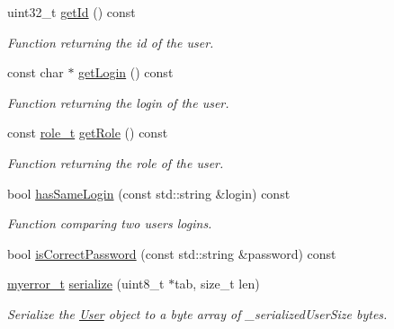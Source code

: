 \begin{DoxyCompactItemize}
uint32\+\_\+t \hyperlink{classUser_aad4f937d81f2db57d71d72aa65fabe84}{get\+Id} () const 
\begin{DoxyCompactList}\small\item\em Function returning the id of the user. \end{DoxyCompactList}\item 
const char $\ast$ \hyperlink{classUser_adba4ac3eacf305b1dcfa7b82dc95817e}{get\+Login} () const 
\begin{DoxyCompactList}\small\item\em Function returning the login of the user. \end{DoxyCompactList}\item 
const \hyperlink{user_8hpp_a147824aa4797bb7a9bcf276b5de0cb7c}{role\+\_\+t} \hyperlink{classUser_a66cf30e2ff6ffcca4b008aa0def0176a}{get\+Role} () const 
\begin{DoxyCompactList}\small\item\em Function returning the role of the user. \end{DoxyCompactList}\item 
bool \hyperlink{classUser_a30d05d38285abd2f9f376a790c7428f0}{has\+Same\+Login} (const std\+::string \&login) const 
\begin{DoxyCompactList}\small\item\em Function comparing two users\textquotesingle{} logins. \end{DoxyCompactList}\item 
bool \hyperlink{classUser_af1e4b148d9c3fcb3c761ceaa405f2087}{is\+Correct\+Password} (const std\+::string \&password) const 
\item 
\hypertarget{classUser_aae31b41cecb2aae7e2d545c8c4036364}{}\hyperlink{error_8hpp_acabd2917084445509becf54ab64a4bd0}{myerror\+\_\+t} \hyperlink{classUser_aae31b41cecb2aae7e2d545c8c4036364}{serialize} (uint8\+\_\+t $\ast$tab, size\+\_\+t len)\label{classUser_aae31b41cecb2aae7e2d545c8c4036364}

\begin{DoxyCompactList}\small\item\em Serialize the \hyperlink{classUser}{User} object to a byte array of {\itshape \+\_\+serialized\+User\+Size} bytes. \end{DoxyCompactList}\end{DoxyCompactItemize}

